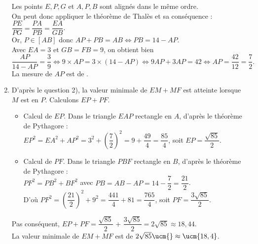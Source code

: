 \begin{enumerate}
         Les points $E, P, G$ et $A, P, B$ sont alignés dans le même ordre. \\
         On peut donc appliquer le théorème de Thalès et sa conséquence : $\dfrac{PE}{PG} =\dfrac{PA}{PB}  =\dfrac{EA}{GB}$. \\
         Or, $P\in[AB]$ donc $AP+PB =AB \iff PB =14-AP$. \\
         Avec $EA =3$ et $GB =FB =9$, on obtient bien 
         $\dfrac{AP}{14-AP} =\dfrac{3}{9} \iff 9\times AP =3\times(14-AP) \iff 9AP+3AP =42 \iff AP =\dfrac{42}{12} =\dfrac{7}{2}.$ \\ [1mm]
         {\blue La mesure de $AP$ est de }.
      \item D'après le question 2), la valeur minimale de $EM+MF$ est atteinte lorsque $M$ est en $P$. Calculons $EP+PF$.
         \begin{itemize}
            \item Calcul de $EP$. Dans le triangle $EAP$ rectangle en $A$, d'après le théorème de Pythagore : \\
               $EP^2 = EA^2 + AP^2=3^2+\left(\dfrac72\right)^2=9+\dfrac{49}{4}=\dfrac{85}{4}$, \quad soit $EP =\dfrac{\sqrt{85}}{2}$.
            \item Calcul de $PF$. Dans le triangle $PBF$ rectangle en $B$, d'après le théorème de Pythagore : \\
               $PF^2 =PB^2+BF^2$ avec $PB =AB-AP =14-\dfrac72 =\dfrac{21}{2}$. \\
               D'où  $PF^2=\left(\dfrac{21}{2}\right)^2+9^2 =\dfrac{441}{4}+81=\dfrac{765}{4}$, \quad soit $PF=\dfrac{3\sqrt{85}}{2}$. \\
         \end{itemize}
         Pas conséquent, $EP+PF =\dfrac{\sqrt{85}}{2}$ + $\dfrac{3\sqrt{85}}{2} =2\sqrt{85}\approx 18,44$. \\
         {\blue La valeur minimale de $EM+MF$ est de $2\sqrt{85} \ucm{}\approx \ucm{18,4}$}.
   \end{enumerate}
